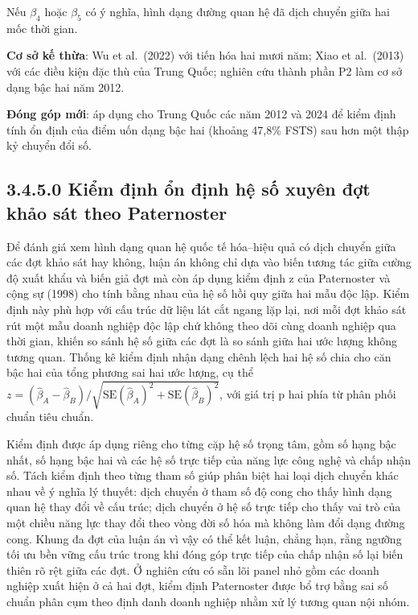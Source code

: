\documentclass[
  a4paper,
  13pt]{extreport}
\begin{document}
Nếu \(\beta_4\) hoặc \(\beta_5\) có ý nghĩa, hình dạng đường quan hệ đã
dịch chuyển giữa hai mốc thời gian.

\textbf{Cơ sở kế thừa}: Wu et al.~(2022) với tiến hóa hai mươi năm; Xiao
et al.~(2013) với các điều kiện đặc thù của Trung Quốc; nghiên cứu thành
phần P2 làm cơ sở dạng bậc hai năm 2012.

\textbf{Đóng góp mới}: áp dụng cho Trung Quốc các năm 2012 và 2024 để
kiểm định tính ổn định của điểm uốn dạng bậc hai (khoảng 47,8\% FSTS)
sau hơn một thập kỷ chuyển đổi số.

\hypertarget{kiux1ec3m-ux111ux1ecbnh-ux1ed5n-ux111ux1ecbnh-hux1ec7-sux1ed1-xuyuxean-ux111ux1ee3t-khux1ea3o-suxe1t-theo-paternoster}{%
\subsection{3.4.5.0 Kiểm định ổn định hệ số xuyên đợt khảo sát theo
Paternoster}\label{kiux1ec3m-ux111ux1ecbnh-ux1ed5n-ux111ux1ecbnh-hux1ec7-sux1ed1-xuyuxean-ux111ux1ee3t-khux1ea3o-suxe1t-theo-paternoster}}

Để đánh giá xem hình dạng quan hệ quốc tế hóa--hiệu quả có dịch chuyển
giữa các đợt khảo sát hay không, luận án không chỉ dựa vào biến tương
tác giữa cường độ xuất khẩu và biến giả đợt mà còn áp dụng kiểm định z
của Paternoster và cộng sự (1998) cho tính bằng nhau của hệ số hồi quy
giữa hai mẫu độc lập. Kiểm định này phù hợp với cấu trúc dữ liệu lát cắt
ngang lặp lại, nơi mỗi đợt khảo sát rút một mẫu doanh nghiệp độc lập chứ
không theo dõi cùng doanh nghiệp qua thời gian, khiến so sánh hệ số giữa
các đợt là so sánh giữa hai ước lượng không tương quan. Thống kê kiểm
định nhận dạng chênh lệch hai hệ số chia cho căn bậc hai của tổng phương
sai hai ước lượng, cụ thể
\(z = (\hat\beta_A - \hat\beta_B) / \sqrt{\text{SE}(\hat\beta_A)^2 + \text{SE}(\hat\beta_B)^2}\),
với giá trị p hai phía từ phân phối chuẩn tiêu chuẩn.

Kiểm định được áp dụng riêng cho từng cặp hệ số trọng tâm, gồm số hạng
bậc nhất, số hạng bậc hai và các hệ số trực tiếp của năng lực công nghệ
và chấp nhận số. Tách kiểm định theo từng tham số giúp phân biệt hai
loại dịch chuyển khác nhau về ý nghĩa lý thuyết: dịch chuyển ở tham số
độ cong cho thấy hình dạng quan hệ thay đổi về cấu trúc; dịch chuyển ở
hệ số trực tiếp cho thấy vai trò của một chiều năng lực thay đổi theo
vòng đời số hóa mà không làm đổi dạng đường cong. Khung đa đợt của luận
án vì vậy có thể kết luận, chẳng hạn, rằng ngưỡng tối ưu bền vững cấu
trúc trong khi đóng góp trực tiếp của chấp nhận số lại biến thiên rõ rệt
giữa các đợt. Ở nghiên cứu có sẵn lõi panel nhỏ gồm các doanh nghiệp
xuất hiện ở cả hai đợt, kiểm định Paternoster được bổ trợ bằng sai số
chuẩn phân cụm theo định danh doanh nghiệp nhằm xử lý tương quan nội
nhóm.
\end{document}
